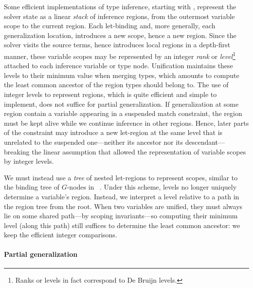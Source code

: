 \documentclass[acmsmall,screen,nonacm%
\Anonymous{,anonymous}{}%
\Final{}{,review}%
]{acmart}
\begin{document}
Some efficient implementations of \ML type inference, starting with
\citet {Remy/mleth}, represent the solver state as a linear
\emph{stack} of inference regions, from the outermost variable scope
to the current region.
%
Each let-binding and, more generally, each generalization location,
introduces a new scope, hence a new region.
%
Since the solver visits the source terms, hence introduces local regions in
a depth-first manner, these variable scopes may be represented by an integer
\emph{rank} or \emph{level}\footnote{Ranks or levels in fact correspond to
  De Bruijn levels.} attached to each inference variable or type node.
Unification maintains these levels to their minimum value when merging
types, which amounts to compute the least common ancestor of the region
types should belong to.
%
The use of integer levels to represent regions, which is quite efficient and
simple to implement, does not suffice for partial generalization.
If generalization at some region contain a variable appearing in a suspended
match constraint, the region must be kept alive while we continue inference
in other regions. Hence, later parts of the constraint may introduce a new
let-region at the same level that is unrelated to the suspended one---neither its
ancestor nor its descendant---breaking the linear assumption that allowed
the representation of variable scopes by integer levels.

We must instead use a \emph{tree} of nested let-regions to represent scopes,
similar to the binding tree of $G$-nodes in
\MLF~\cite{Remy-Yakobowski/mlf-type-inference@icfp08}. Under this scheme,
levels no longer uniquely determine a variable's region.  Instead, we interpret
a level relative to a path in the region tree from the root. When two variables
are unified, they must always lie on some shared path---by scoping
invariants---so computing their minimum level (along this path) still suffices
to determine the least common ancestor: we keep the efficient integer
comparisons.

\paragraph{Partial generalization}
\end{document}
